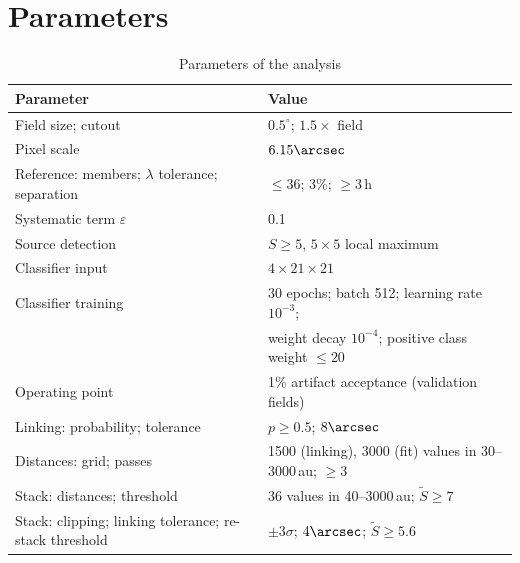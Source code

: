 \documentclass[twocolumn,linenumbers,anonymous]{aastex702}
\begin{document}
\section{Parameters}\label{app:set}
\begin{table}[h]
\centering
\caption{Parameters of the analysis\label{tab:set}}
\begin{tabular}{ll}
\hline\hline
Parameter & Value \\
\hline
Field size; cutout & $0.5^\circ$; $1.5\times$ field \\
Pixel scale & $6.15\arcsec$ \\
Reference: members; $\lambda$ tolerance; separation & $\le 36$; 3\%; $\ge 3$\,h \\
Systematic term $\varepsilon$ & 0.1 \\
Source detection & $S \ge 5$, $5\times5$ local maximum \\
Classifier input & $4 \times 21 \times 21$ \\
Classifier training & 30 epochs; batch 512; learning rate $10^{-3}$;\\
 & weight decay $10^{-4}$; positive class weight $\le 20$ \\
Operating point & 1\% artifact acceptance (validation fields) \\
Linking: probability; tolerance & $p \ge 0.5$; $8\arcsec$ \\
Distances: grid; passes & 1500 (linking), 3000 (fit) values in 30--3000\,au; $\ge 3$ \\
Stack: distances; threshold & 36 values in 40--3000\,au; $\widetilde{S} \ge 7$ \\
Stack: clipping; linking tolerance; re-stack threshold & $\pm 3\sigma$; $4\arcsec$; $\widetilde{S} \ge 5.6$ \\
\hline
\end{tabular}
\end{table}
\end{document}
